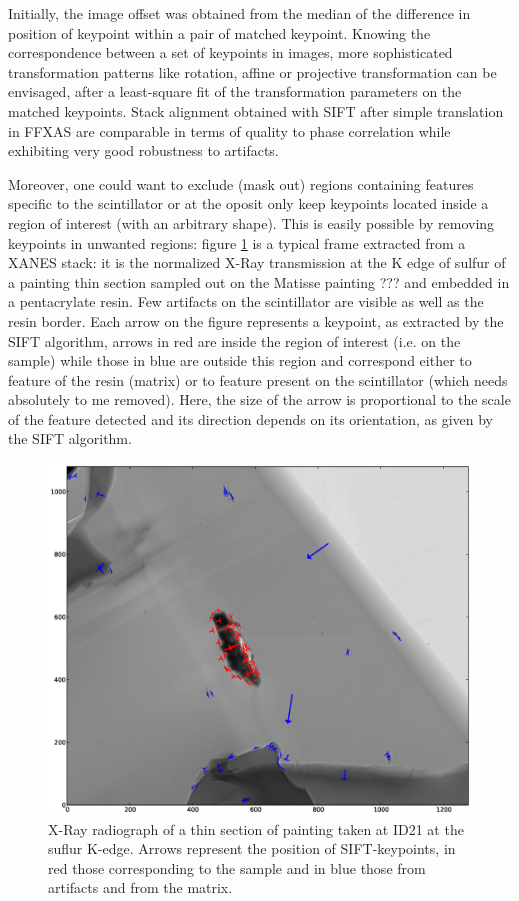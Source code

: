 \documentclass[preprint]{iucr}
\begin{document}
Initially, the image offset was obtained from the median of the
difference in position of keypoint within a pair of matched keypoint.
Knowing the correspondence between a set of keypoints in images,
more sophisticated transformation patterns like rotation, affine
or projective transformation can be envisaged, after a least-square fit of the
transformation parameters on the matched keypoints.
Stack alignment obtained with SIFT after simple translation in FFXAS are
comparable in terms of quality to phase correlation while exhibiting very good
robustness to artifacts.

Moreover, one could want to exclude (mask out) regions containing features
specific to the scintillator or at the oposit only keep keypoints located
inside a region of interest (with an arbitrary shape).
This is easily possible by removing keypoints in unwanted regions:
figure \ref{sample} is a typical frame extracted from a XANES stack:
it is the normalized X-Ray transmission at the K edge of sulfur of a painting
thin section sampled out on the Matisse painting ??? and embedded in
a pentacrylate resin.
Few artifacts on the scintillator are visible as well as the resin border.
Each arrow on the figure represents a keypoint, as extracted by the SIFT
algorithm, arrows in red are inside the region of interest (i.e. on the sample)
while those in blue are outside this region and
correspond either to feature of the resin (matrix) or to feature present on the
scintillator (which needs absolutely to me removed).
Here, the size of the arrow is proportional to the scale of the feature
detected and its direction depends on its orientation, as given by the SIFT algorithm.

\begin{figure}
\begin{center}
\includegraphics[width=15cm]{features.eps}
\caption{\label{sample} X-Ray radiograph of a thin section of painting
taken at ID21 at the suflur K-edge. Arrows represent the position of SIFT-keypoints, in red
those corresponding to the sample and in blue those from artifacts and from
the matrix.}
\end{center}
\end{figure}
\end{document}

